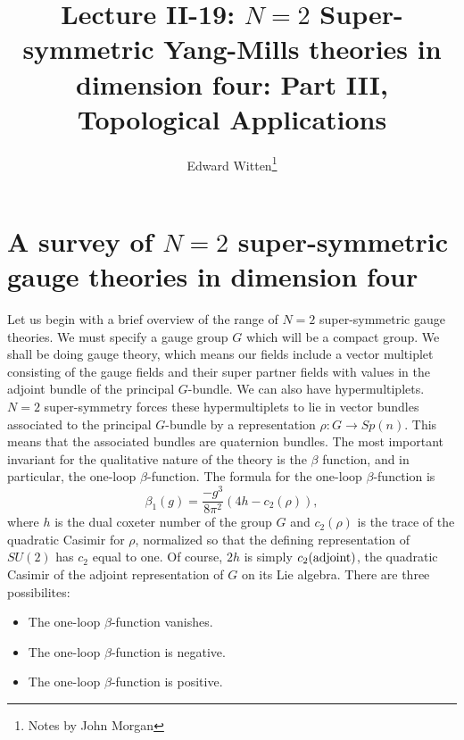 \documentclass[10pt]{article}
\title{Lecture II-19: $N=2$ Super-symmetric Yang-Mills theories in
dimension four: Part III, Topological Applications}
\author{Edward Witten\thanks{Notes by John Morgan}}
\date{}
\begin{document}
\maketitle


\section{A survey of $N=2$ super-symmetric gauge theories in dimension
four} 

Let us begin with a brief overview of
the range of $N=2$ super-symmetric gauge theories.
We must specify a gauge group $G$ which will be a compact group. 
We shall be doing gauge theory, which means our fields include
a vector multiplet consisting of the gauge fields
and  their super partner fields with values in the adjoint bundle of
the principal $G$-bundle.  We can  also have hypermultiplets.  $N=2$
super-symmetry forces these hypermultiplets to lie in vector bundles
associated to the principal $G$-bundle 
by a representation $\rho\colon G\to Sp(n)$.  This means that the
associated bundles are quaternion bundles.
The most important invariant for the qualitative nature of the theory
is the $\beta$ function, and in particular, the one-loop
$\beta$-function. 
The formula for the one-loop $\beta$-function is
$$\beta_1(g)=\frac{-g^3}{8\pi^2}(4h-c_2(\rho)),$$
where $h$ is the dual coxeter number of the group $G$ and $c_2(\rho)$
is the trace of the quadratic Casimir for $\rho$, normalized so that
the defining representation of $SU(2)$ has $c_2$ equal to one.
Of course, $2h$ is simply $c_2({\rm adjoint})$, the quadratic Casimir of
the adjoint representation of $G$ on its Lie algebra.
There are three possibilites:
\begin{itemize}
\item The one-loop $\beta$-function vanishes.
\item The one-loop $\beta$-function is negative.
\item The one-loop $\beta$-function is positive.
\end{itemize}
\end{document}
